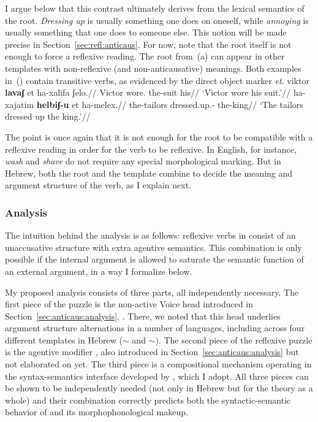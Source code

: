I argue below that this contrast ultimately derives from the lexical semantics of the root. \emph{Dressing up} is usually something one does on oneself, while \emph{annoying} is usually something that one does to someone else. This notion will be made precise in Section~\ref{sec:refl:anticaus}. For now, note that the root itself is not enough to force a reflexive reading. The root  from~(\lastx a) can appear in other templates with non-reflexive (and non-anticausative) meanings. Both examples in~(\nextx) contain transitive verbs, as evidenced by the direct object marker \emph{et}.
\pex
	\a \begingl
		\gla viktor \textbf{lavaʃ} et ha-xalifa ʃelo.//
		\glb Victor wore.  the-suit his//
		\glft `Victor wore his suit.'//
		\endgl
	\a \begingl
		\gla ha-xajatim \textbf{helbiʃ-u} et ha-melex.//
		\glb the-tailors dressed.up.-  the-king//
		\glft `The tailors dressed up the king.'//
		\endgl
\xe

The point is once again that it is not enough for the root to be compatible with a reflexive reading in order for the verb to be reflexive. In English, for instance, \emph{wash} and \emph{shave} do not require any special morphological marking. But in Hebrew, both the root and the template combine to decide the meaning and argument structure of the verb, as I explain next.


	\subsubsection{Analysis}
The intuition behind the analysis is as follows: reflexive verbs in {\thit} consist of an unaccusative structure with extra agentive semantics. This combination is only possible if the internal argument is allowed to saturate the semantic function of an external argument, in a way I formalize below.

My proposed analysis consists of three parts, all independently necessary. The first piece of the puzzle is the non-active Voice head introduced in Section~\ref{sec:anticaus:analysis}, {\vz}. There, we noted that this head underlies argument structure alternations in a number of languages, including across four different templates in Hebrew ({\tkal}$\sim${\tnif} and {\tpie}$\sim${\thit}). The second piece of the reflexive puzzle is the agentive modifier {\va}, also introduced in Section~\ref{sec:anticaus:analysis} but not elaborated on yet. The third piece is a compositional mechanism operating in the syntax-semantics interface developed by \cite{wood14nllt}, which I adopt. All three pieces can be shown to be independently needed (not only in Hebrew but for the theory as a whole) and their combination correctly predicts both the syntactic-semantic behavior of {\thit} and its morphophonological makeup.


